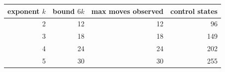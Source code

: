 \begin{tabular}{rrrr}\toprule exponent $k$ & bound $6k$ & max moves observed & control states\\\midrule
2 & 12 & 12 & 96 \\
3 & 18 & 18 & 149 \\
4 & 24 & 24 & 202 \\
5 & 30 & 30 & 255 \\
\bottomrule\end{tabular}
